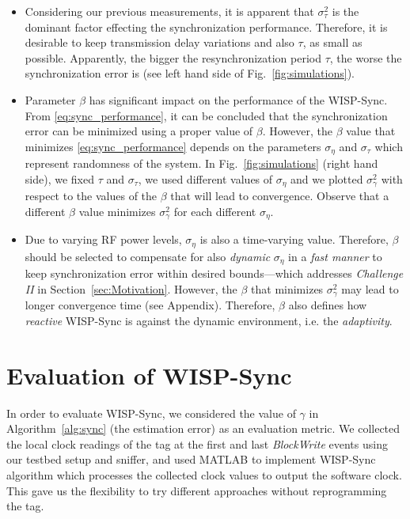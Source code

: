 \documentclass[journal,draftcls,onecolumn,12pt,twoside]{IEEEtranTCOM}
\begin{document}
\begin{itemize}
\item Considering our previous measurements, it is apparent that $\sigma^2_{\tau}$ is the dominant factor effecting the synchronization performance. Therefore, it is desirable to keep transmission delay variations and also $\tau$, as small as possible. Apparently, the bigger the resynchronization period $\tau$, the worse the synchronization error is (see left hand side of Fig.~\ref{fig:simulations}). 

\item Parameter $\beta$ has significant impact on the performance of the WISP-Sync. From 	\eqref{eq:sync_performance}, it can be concluded that the synchronization error can be minimized using a proper value of $\beta$. However, the $\beta$ value that minimizes 	\eqref{eq:sync_performance} depends on the parameters $\sigma_{\eta}$ and $\sigma_{\tau}$ which represent randomness of the system. In Fig.~\ref{fig:simulations} (right hand side), we fixed $\tau$ and $\sigma_{\tau}$, we used different values of $\sigma_{\eta}$ and we plotted $\sigma^2_{\gamma}$ with respect to the values of the $\beta$ that will lead to convergence. Observe that a different $\beta$ value minimizes $\sigma^2_{\gamma}$ for each different $\sigma_{\eta}$. 
	
\item Due to varying RF power levels, $\sigma_{\eta}$ is also a time-varying value. Therefore, $\beta$ should be selected to compensate for also \emph{dynamic} $\sigma_{\eta}$ in a \emph{fast manner} to keep synchronization error within desired bounds---which addresses \emph{Challenge II} in Section~\ref{sec:Motivation}. However, the $\beta$ that minimizes $\sigma^2_{\gamma}$ may lead to longer convergence time (see Appendix). Therefore, $\beta$ also defines how \emph{reactive} WISP-Sync is against the dynamic environment, i.e. the \emph{adaptivity}.
\end{itemize}

\section{Evaluation of WISP-Sync}
\label{sec:eval-wispsync}

In order to evaluate WISP-Sync, we considered the value of $\gamma$ in Algorithm~\ref{alg:sync} (the estimation error) as an evaluation metric. We collected the local clock readings of the tag at the first and last \emph{BlockWrite} events using our testbed setup and sniffer, and used MATLAB to implement WISP-Sync algorithm which processes the collected clock values to output the software clock. This gave us the flexibility to try different approaches without reprogramming the tag.
\end{document}
